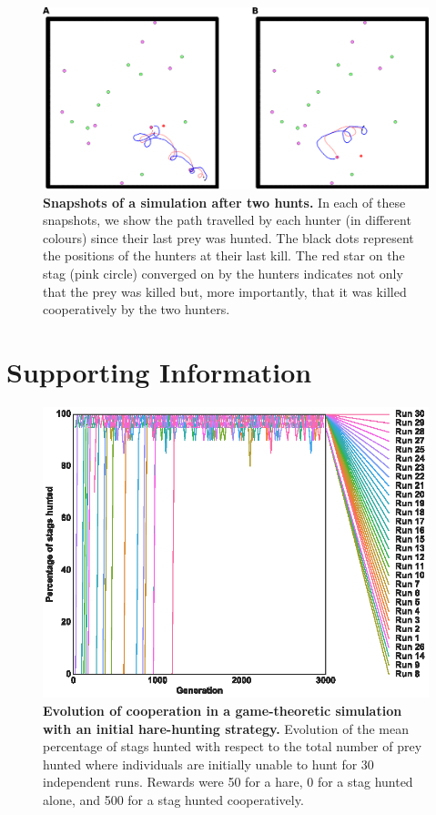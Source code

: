   \begin{figure}[h]
    \centerfloat
      \includegraphics[scale = 0.9]{fig/ArticleBio1/Fig8.png}
    \caption{\textbf{Snapshots of a simulation after two hunts.}
    In each of these snapshots, we show the path travelled by each hunter (in different colours) since their last prey was hunted. The black dots represent the positions of the hunters at their last kill. The red star on the stag (pink circle) converged on by the hunters indicates not only that the prey was killed but, more importantly, that it was killed cooperatively by the two hunters.}
    \label{fig:behaviourTraces}
  \end{figure}

\clearpage

\section{Supporting Information}
  \begin{figure}[h]
    \centering
      \includegraphics[scale = 1.0]{fig/ArticleBio1/S1_Fig.eps}
    \caption{\textbf{Evolution of cooperation in a game-theoretic simulation with an initial hare-hunting strategy.} 
    Evolution of the mean percentage of stags hunted with respect to the total number of prey hunted where individuals are initially unable to hunt for 30 independent runs. Rewards were 50 for a hare, 0 for a stag hunted alone, and 500 for a stag hunted cooperatively.}
    \label{fig:S1_Fig}
  \end{figure}

